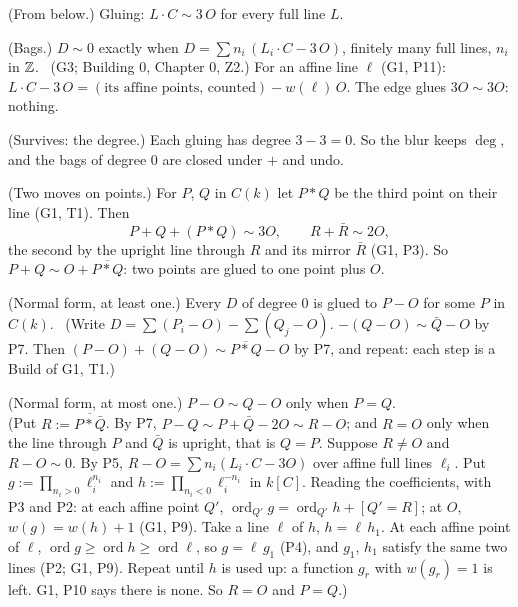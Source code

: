 \begin{lines}
\item[\lab{B1}] (From below.) Gluing: $L \cdot C \sim 3\,O$ for every full line $L$.
\item[\lab{P5}] (Bags.) $D \sim 0$ exactly when $D = \sum n_i\,(L_i \cdot C - 3\,O)$, finitely many full lines, $n_i$ in $\mathbb{Z}$. \ (G3; Building 0, Chapter 0, Z2.) For an affine line $\ell$ (G1, P11): $L \cdot C - 3\,O = (\text{its affine points, counted}) - w(\ell)\,O$. The edge glues $3O \sim 3O$: nothing.
\item[\lab{P6}] (Survives: the degree.) Each gluing has degree $3 - 3 = 0$. So the blur keeps $\deg$, and the bags of degree $0$ are closed under $+$ and undo.
\item[\lab{P7}] (Two moves on points.) For $P$, $Q$ in $C(k)$ let $P * Q$ be the third point on their line (G1, T1). Then \[ P + Q + (P * Q) \sim 3O, \qquad R + \bar R \sim 2O, \] the second by the upright line through $R$ and its mirror $\bar R$ (G1, P3). So $P + Q \sim O + \overline{P * Q}$: two points are glued to one point plus $O$.
\item[\lab{P8}] (Normal form, at least one.) Every $D$ of degree $0$ is glued to $P - O$ for some $P$ in $C(k)$. \ (Write $D = \sum (P_i - O) - \sum (Q_j - O)$. $-(Q - O) \sim \bar Q - O$ by P7. Then $(P - O) + (Q - O) \sim \overline{P * Q} - O$ by P7, and repeat: each step is a Build of G1, T1.)
\item[\lab{P9}] (Normal form, at most one.) $P - O \sim Q - O$ only when $P = Q$. \\
(Put $R := \overline{P * \bar Q}$. By P7, $P - Q \sim P + \bar Q - 2O \sim R - O$; and $R = O$ only when the line through $P$ and $\bar Q$ is upright, that is $Q = P$. Suppose $R \ne O$ and $R - O \sim 0$. By P5, $R - O = \sum n_i (L_i \cdot C - 3O)$ over affine full lines $\ell_i$. Put $g := \prod_{n_i > 0} \ell_i^{n_i}$ and $h := \prod_{n_i < 0} \ell_i^{-n_i}$ in $k[C]$. Reading the coefficients, with P3 and P2: at each affine point $Q'$, $\operatorname{ord}_{Q'} g = \operatorname{ord}_{Q'} h + [Q' = R]$; at $O$, $w(g) = w(h) + 1$ (G1, P9). Take a line $\ell$ of $h$, $h = \ell\,h_1$. At each affine point of $\ell$, $\operatorname{ord} g \ge \operatorname{ord} h \ge \operatorname{ord} \ell$, so $g = \ell\,g_1$ (P4), and $g_1$, $h_1$ satisfy the same two lines (P2; G1, P9). Repeat until $h$ is used up: a function $g_r$ with $w(g_r) = 1$ is left. G1, P10 says there is none. So $R = O$ and $P = Q$.)
\end{lines}

